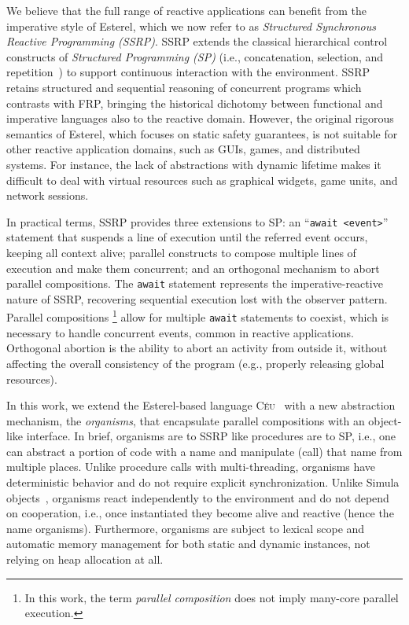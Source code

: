 \documentclass{sigplanconf}
\newcommand{\CEU}{\textsc{C\'{e}u}\xspace}
\newcommand{\code}[1] {{\small{\texttt{#1}}}}
\newcommand{\1}{\;}
\newcommand{\2}{\;\;}
\newcommand{\3}{\;\;\;}
\newcommand{\5}{\;\;\;\;\;}
\begin{document}
We believe that the full range of reactive applications can benefit from the 
imperative style of Esterel, which we now refer to as \emph{Structured 
Synchronous Reactive Programming (SSRP)}.
%
SSRP extends the classical hierarchical control constructs of \emph{Structured 
Programming (SP)} (i.e., concatenation, selection, and 
repetition~\cite{dij.notes}) to support continuous interaction with the 
environment.
%
SSRP retains structured and sequential reasoning of concurrent programs which 
contrasts with FRP, bringing the historical dichotomy between functional and 
imperative languages also to the reactive domain.
%
However, the original rigorous semantics of Esterel, which focuses on static 
safety guarantees, is not suitable for other reactive application domains, such 
as GUIs, games, and distributed systems.
%
For instance, the lack of abstractions with dynamic lifetime makes it difficult 
to deal with virtual resources such as graphical widgets, game units, and 
network sessions.

In practical terms, SSRP provides three extensions to SP:
an ``\code{await <event>}'' statement that suspends a line of execution until 
the referred event occurs, keeping all context alive;
parallel constructs to compose multiple lines of execution and make them 
concurrent;
and an orthogonal mechanism to abort parallel compositions.
%
The \code{await} statement represents the imperative-reactive nature of SSRP, 
recovering sequential execution lost with the observer pattern.
%
Parallel compositions%
\footnote{
In this work, the term \emph{parallel composition} does not imply many-core 
parallel execution.
}
allow for multiple \code{await} statements to coexist, which is necessary to 
handle concurrent events, common in reactive applications.
%
Orthogonal abortion is the ability to abort an activity from outside it, 
without affecting the overall consistency of the program (e.g., properly 
releasing global resources).

In this work, we extend the Esterel-based language \CEU~\cite{ceu.sensys13} 
with a new abstraction mechanism, the \emph{organisms}, that encapsulate 
parallel compositions with an object-like interface.
%
In brief, organisms are to SSRP like procedures are to SP, i.e., one can 
abstract a portion of code with a name and manipulate (call) that name from 
multiple places.
%
Unlike procedure calls with multi-threading, organisms have deterministic 
behavior and do not require explicit synchronization.
%
Unlike Simula objects~\cite{simula}, organisms react independently to the 
environment and do not depend on cooperation, i.e., once instantiated they 
become alive and reactive (hence the name organisms).
%
%
Furthermore, organisms are subject to lexical scope and automatic memory 
management for both static and dynamic instances, not relying on heap 
allocation at all.
%
\end{document}
